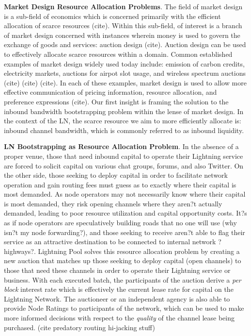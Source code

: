\documentclass[12pt,a4paper]{article}
\theoremstyle{definition}
\begin{document}
\textbf{Market Design Resource Allocation Problems}. The field of market design
is a sub-field of economics which is concerned primarily with the efficient
allocation of scarce resources (cite). Within this sub-field, of interest is a
branch of market design concerned with instances wherein money is used to
govern the exchange of goods and services: auction design (cite). Auction
design can be used to effectively allocate scarce resources within a domain.
Common established examples of market design widely used today include:
emission of carbon credits, electricity markets, auctions for airpot slot
usage, and wireless spectrum auctions (cite) (cite) (cite). In each of these
examples, market design is used to allow more effective communication of
pricing information, resource allocation, and preference expressions (cite).
Our first insight is framing the solution to the inbound bandwidth
bootstrapping problem within the lense of market design. In the context of the
LN, the scarce resource we aim to more efficiently allocate is: inbound channel
bandwidth, which is commonly referred to as inbound liquidity. 

\textbf{LN Bootstrapping as Resource Allocation Problem}. In the absence of a
proper venue, those that need inbound capital to operate their Lightning
service are forced to solicit capital on various chat groups, forums, and also
Twitter. On the other side, those seeking to deploy capital in order to
facilitate network operation and gain routing fees must guess as to exactly
where their capital is most demanded. As node operators may not necessarily
know where their capital is most demanded, they risk opening channels where
they aren?t actually demanded, leading to poor resource utilization and capital
opportunity costs. It?s as if node operators are speculatively building roads
that no one will use (why isn?t my node forwarding?), and those seeking to
receive aren?t able to flag their service as an attractive destination to be
connected to internal network ?highways?. Lightning Pool solves this resource
allocation problem by creating a new auction that matches up those seeking to
deploy capital (open channels) to those that need these channels in order to
operate their Lightning service or business. With each executed batch, the
participants of the auction derive a \emph{per block} interest rate which is
effectively the current lease rate for capital on the Lightning Network. The
auctioneer or an independent agency is also able to provide Node Ratings to
participants of the network, which can be used to make more informed decisions
with respect to the \emph{quality} of the channel lease being purchased. (cite
predatory routing hi-jacking stuff)
\end{document}
